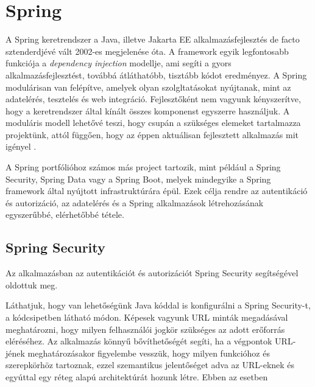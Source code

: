 \section{Spring}

A Spring keretrendszer a Java, illetve Jakarta EE alkalmazásfejlesztés de facto sztenderdjévé vált 2002-es megjelenése óta. A framework egyik legfontosabb funkciója a \emph{dependency injection} modellje, ami segíti a gyors alkalmazásfejlesztést, továbbá átláthatóbb, tisztább kódot eredményez. A Spring modulárisan van felépítve, amelyek olyan szolgltatásokat nyújtanak, mint az adatelérés, tesztelés és web integráció. Fejlesztőként nem vagyunk kényszerítve, hogy a keretrendszer által kínált összes komponenst egyszerre használjuk. A moduláris modell lehetővé teszi, hogy csupán a szükséges elemeket tartalmazza projektünk, attól függően, hogy az éppen aktuálisan fejlesztett alkalmazás mit igényel \cite{buildingSpringRest}.\par

A Spring portfólióhoz számos más project tartozik, mint például a Spring Security, Spring Data vagy a Spring Boot, melyek mindegyike a Spring framework által nyújtott infrastruktúrára épül. Ezek célja rendre az autentikáció és autorizáció, az adatelérés és a Spring alkalmazások létrehozásának egyszerűbbé, elérhetőbbé tétele. \par

\subsection{Spring Security}

Az alkalmazásban az autentikációt és autorizációt Spring Security segítségével oldottuk meg.


Láthatjuk, hogy van lehetőségünk Java kóddal is konfigurálni a Spring Security-t, a kódcsipetben látható módon. Képesek vagyunk URL minták megadásával meghatározni, hogy milyen felhasználói jogkör szükséges az adott erőforrás eléréséhez. Az alkalmazás könnyű bővíthetőségét segíti, ha a végpontok URL-jének meghatározásakor figyelembe vesszük, hogy milyen funkcióhoz és szerepkörhöz tartoznak, ezzel szemantikus jelentőséget adva az URL-eknek és egyúttal egy réteg alapú architektúrát hozunk létre. Ebben az esetben

